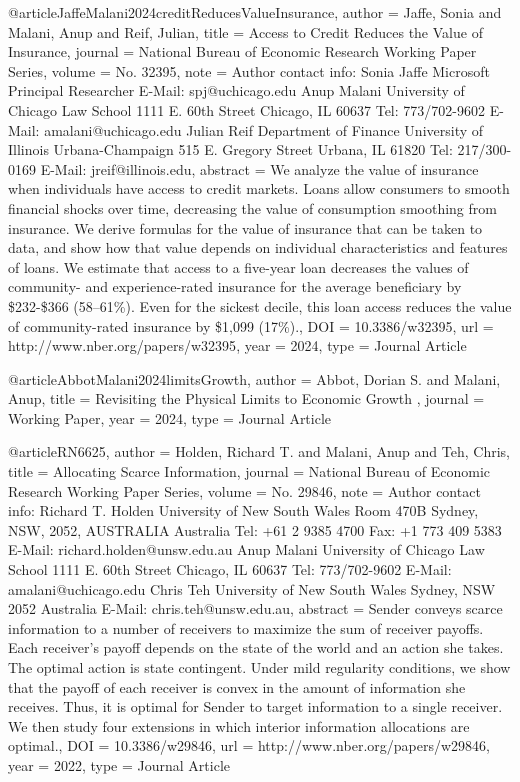 {{@article{JaffeMalani2024creditReducesValueInsurance,
   author = {Jaffe, Sonia and Malani, Anup and Reif, Julian},
   title = {Access to Credit Reduces the Value of Insurance},
   journal = {National Bureau of Economic Research Working Paper Series},
   volume = {No. 32395},
   note = {Author contact info: Sonia Jaffe Microsoft Principal Researcher E-Mail: spj@uchicago.edu Anup Malani University of Chicago Law School 1111 E. 60th Street Chicago, IL 60637 Tel: 773/702-9602 E-Mail: amalani@uchicago.edu Julian Reif Department of Finance University of Illinois Urbana-Champaign 515 E. Gregory Street Urbana, IL 61820 Tel: 217/300-0169 E-Mail: jreif@illinois.edu},
   abstract = {We analyze the value of insurance when individuals have access to credit markets. Loans allow consumers to smooth financial shocks over time, decreasing the value of consumption smoothing from insurance. We derive formulas for the value of insurance that can be taken to data, and show how that value depends on individual characteristics and features of loans. We estimate that access to a five-year loan decreases the values of community- and experience-rated insurance for the average beneficiary by \$232-\$366 (58--61\%). Even for the sickest decile, this loan access reduces the value of community-rated insurance by \$1,099 (17\%).},
   DOI = {10.3386/w32395},
   url = {http://www.nber.org/papers/w32395},
   year = {2024},
   type = {Journal Article}
}

@article{AbbotMalani2024limitsGrowth,
   author = {Abbot, Dorian S. and Malani, Anup},
   title = {Revisiting the Physical Limits to Economic Growth },
   journal = {Working Paper},
   year = {2024},
   type = {Journal Article}
}

@article{RN6625,
   author = {Holden, Richard T. and Malani, Anup and Teh, Chris},
   title = {Allocating Scarce Information},
   journal = {National Bureau of Economic Research Working Paper Series},
   volume = {No. 29846},
   note = {Author contact info: Richard T. Holden University of New South Wales Room 470B Sydney, NSW, 2052, AUSTRALIA Australia Tel: +61 2 9385 4700 Fax: +1 773 409 5383 E-Mail: richard.holden@unsw.edu.au Anup Malani University of Chicago Law School 1111 E. 60th Street Chicago, IL 60637 Tel: 773/702-9602 E-Mail: amalani@uchicago.edu Chris Teh University of New South Wales Sydney, NSW 2052 Australia E-Mail: chris.teh@unsw.edu.au},
   abstract = {Sender conveys scarce information to a number of receivers to maximize the sum of receiver payoffs. Each receiver’s payoff depends on the state of the world and an action she takes. The optimal action is state contingent. Under mild regularity conditions, we show that the payoff of each receiver is convex in the amount of information she receives. Thus, it is optimal for Sender to target information to a single receiver. We then study four extensions in which interior information allocations are optimal.},
   DOI = {10.3386/w29846},
   url = {http://www.nber.org/papers/w29846},
   year = {2022},
   type = {Journal Article}
}

}}
